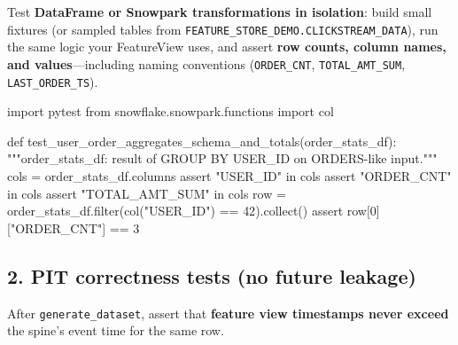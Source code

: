 \documentclass[
  letterpaper,
  DIV=11,
  numbers=noendperiod]{scrreprt}
\newenvironment{Shaded}{\begin{snugshade}}{\end{snugshade}}
\newcommand{\BuiltInTok}[1]{\textcolor[rgb]{0.00,0.23,0.31}{#1}}
\newcommand{\CommentTok}[1]{\textcolor[rgb]{0.37,0.37,0.37}{#1}}
\newcommand{\ControlFlowTok}[1]{\textcolor[rgb]{0.00,0.23,0.31}{#1}}
\newcommand{\DecValTok}[1]{\textcolor[rgb]{0.68,0.00,0.00}{#1}}
\newcommand{\ImportTok}[1]{\textcolor[rgb]{0.00,0.46,0.62}{#1}}
\newcommand{\KeywordTok}[1]{\textcolor[rgb]{0.00,0.23,0.31}{#1}}
\newcommand{\NormalTok}[1]{\textcolor[rgb]{0.00,0.23,0.31}{#1}}
\newcommand{\OperatorTok}[1]{\textcolor[rgb]{0.37,0.37,0.37}{#1}}
\newcommand{\StringTok}[1]{\textcolor[rgb]{0.13,0.47,0.30}{#1}}
\begin{document}
Test \textbf{DataFrame or Snowpark transformations in isolation}: build
small fixtures (or sampled tables from
\texttt{FEATURE\_STORE\_DEMO.CLICKSTREAM\_DATA}), run the same logic
your FeatureView uses, and assert \textbf{row counts, column names, and
values}---including naming conventions (\texttt{ORDER\_CNT},
\texttt{TOTAL\_AMT\_SUM}, \texttt{LAST\_ORDER\_TS}).

\begin{Shaded}
\begin{Highlighting}[]
\ImportTok{import}\NormalTok{ pytest}
\ImportTok{from}\NormalTok{ snowflake.snowpark.functions }\ImportTok{import}\NormalTok{ col}

\KeywordTok{def}\NormalTok{ test\_user\_order\_aggregates\_schema\_and\_totals(order\_stats\_df):}
    \CommentTok{"""order\_stats\_df: result of GROUP BY USER\_ID on ORDERS{-}like input."""}
\NormalTok{    cols }\OperatorTok{=}\NormalTok{ order\_stats\_df.columns}
    \ControlFlowTok{assert} \StringTok{"USER\_ID"} \KeywordTok{in}\NormalTok{ cols}
    \ControlFlowTok{assert} \StringTok{"ORDER\_CNT"} \KeywordTok{in}\NormalTok{ cols}
    \ControlFlowTok{assert} \StringTok{"TOTAL\_AMT\_SUM"} \KeywordTok{in}\NormalTok{ cols}
\NormalTok{    row }\OperatorTok{=}\NormalTok{ order\_stats\_df.}\BuiltInTok{filter}\NormalTok{(col(}\StringTok{"USER\_ID"}\NormalTok{) }\OperatorTok{==} \DecValTok{42}\NormalTok{).collect()}
    \ControlFlowTok{assert}\NormalTok{ row[}\DecValTok{0}\NormalTok{][}\StringTok{"ORDER\_CNT"}\NormalTok{] }\OperatorTok{==} \DecValTok{3}
\end{Highlighting}
\end{Shaded}

\hypertarget{pit-correctness-tests-no-future-leakage}{%
\subsection{2. PIT correctness tests (no future
leakage)}\label{pit-correctness-tests-no-future-leakage}}

After \texttt{generate\_dataset}, assert that \textbf{feature view
timestamps never exceed} the spine's event time for the same row.
\end{document}
